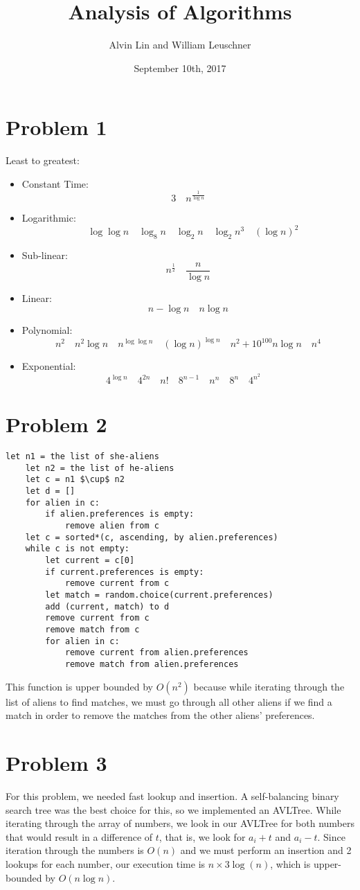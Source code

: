 \documentclass[letterpaper, 12pt]{math}
\title{Analysis of Algorithms}
\author{Alvin Lin and William Leuschner}
\date{September 10th, 2017}
\begin{document}
\maketitle

\section*{Problem 1}
Least to greatest:
\begin{itemize}
  \item Constant Time:
  \[ 3 \quad n^{\frac{1}{\log n}} \]
  \item Logarithmic:
  \[ \quad \log\log n \quad \log_8 n \quad \log_2 n \quad \log_2 n^3 \quad
    (\log n)^2 \]
  \item Sub-linear:
  \[ n^{\frac{1}{2}} \quad \frac{n}{\log n} \]
  \item Linear:
  \[ n-\log n \quad n\log n \]
  \item Polynomial:
  \[ n^2 \quad n^2\log n \quad n^{\log\log n} \quad (\log n)^{\log n} \quad
    n^2+10^{100}n\log n \quad n^4 \]
  \item Exponential:
  \[ 4^{\log n} \quad 4^{2n} \quad n! \quad 8^{n-1} \quad n^n\quad 8^n \quad
    4^{n^2} \quad \]
\end{itemize}

\section*{Problem 2}
\begin{lstlisting}[mathescape=true]
    let n1 = the list of she-aliens
    let n2 = the list of he-aliens
    let c = n1 $\cup$ n2
    let d = []
    for alien in c:
        if alien.preferences is empty:
            remove alien from c
    let c = sorted*(c, ascending, by alien.preferences)
    while c is not empty:
        let current = c[0]
        if current.preferences is empty:
            remove current from c
        let match = random.choice(current.preferences)
        add (current, match) to d
        remove current from c
        remove match from c
        for alien in c:
            remove current from alien.preferences
            remove match from alien.preferences
\end{lstlisting}
This function is upper bounded by \( O(n^2) \) because while iterating through
the list of aliens to find matches, we must go through all other aliens if we
find a match in order to remove the matches from the other aliens' preferences.

\section*{Problem 3}
For this problem, we needed fast lookup and insertion. A self-balancing binary
search tree was the best choice for this, so we implemented an AVLTree.
While iterating through the array of numbers, we look in our AVLTree for both
numbers that would result in a difference of \( t \), that is, we look for
\( a_i+t \) and \( a_i-t \). Since iteration through the numbers is
\( O(n) \) and we must perform an insertion and 2 lookups for each number, our
execution time is \( n\times3\log(n) \), which is upper-bounded by \( O(n\log
n) \).
\end{document}

